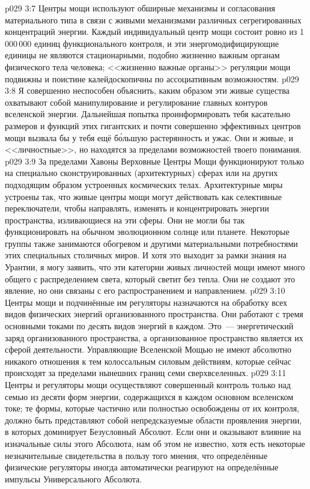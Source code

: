 \vs p029 3:7 Центры мощи используют обширные механизмы и согласования материального типа в связи с живыми механизмами различных сегрегированных концентраций энергии. Каждый индивидуальный центр мощи состоит ровно из 1\,000\,000 единиц функционального контроля, и эти энергомодифицирующие единицы не являются стационарными, подобно жизненно важным органам физического тела человека; <<жизненно важные органы>> регуляции мощи подвижны и поистине калейдоскопичны по ассоциативным возможностям.
\vs p029 3:8 Я совершенно неспособен объяснить, каким образом эти живые существа охватывают собой манипулирование и регулирование главных контуров вселенской энергии. Дальнейшая попытка проинформировать тебя касательно размеров и функций этих гигантских и почти совершенно эффективных центров мощи вызвала бы у тебя ещё б\'ольшую растерянность и ужас. Они и живые, и <<личностные>>, но находятся за пределами возможностей твоего понимания.
\vs p029 3:9 \pc За пределами Хавоны Верховные Центры Мощи функционируют только на специально сконструированных (архитектурных) сферах или на других подходящим образом устроенных космических телах. Архитектурные миры устроены так, что живые центры мощи могут действовать как селективные переключатели, чтобы направлять, изменять и концентрировать энергии пространства, изливающиеся на эти сферы. Они не могли бы так функционировать на обычном эволюционном солнце или планете. Некоторые группы также занимаются обогревом и другими материальными потребностями этих специальных столичных миров. И хотя это выходит за рамки знания на Урантии, я могу заявить, что эти категории живых личностей мощи имеют много общего с распределением света, который светит без тепла. Они не создают это явление, но они связаны с его распространением и направлением.
\vs p029 3:10 \pc Центры мощи и подчинённые им регуляторы назначаются на обработку всех видов физических энергий организованного пространства. Они работают с тремя основными токами по десять видов энергий в каждом. Это~--- энергетический заряд организованного пространства, а организованное пространство является их сферой деятельности. Управляющие Вселенской Мощью не имеют абсолютно никакого отношения к тем колоссальным силовым действиям, которые сейчас происходят за пределами нынешних границ семи сверхвселенных.
\vs p029 3:11 Центры и регуляторы мощи осуществляют совершенный контроль только над семью из десяти форм энергии, содержащихся в каждом основном вселенском токе; те формы, которые частично или полностью освобождены от их контроля, должно быть представляют собой непредсказуемые области проявления энергии, в которых доминирует Безусловный Абсолют. Если они и оказывают влияние на изначальные силы этого Абсолюта, нам об этом не известно, хотя есть некоторые незначительные свидетельства в пользу того мнения, что определённые физические регуляторы иногда автоматически реагируют на определённые импульсы Универсального Абсолюта.
